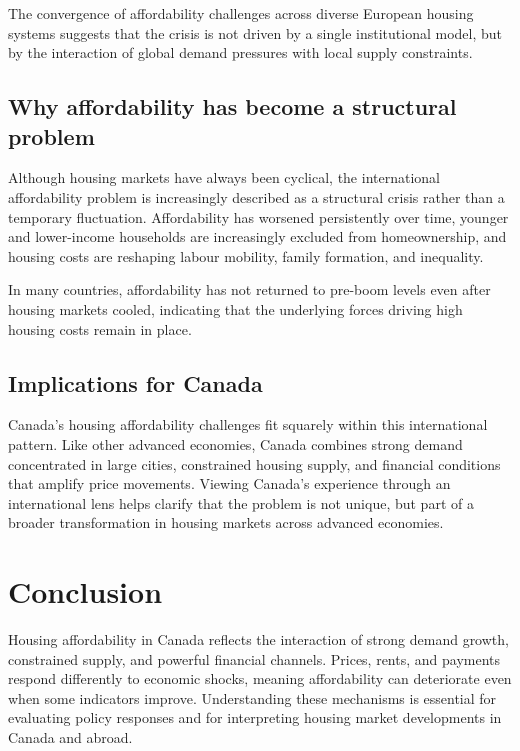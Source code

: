 \documentclass[11pt]{article}
\begin{document}
The convergence of affordability challenges across diverse European housing systems suggests that the crisis is not driven by a single institutional model, but by the interaction of global demand pressures with local supply constraints.

\subsection*{Why affordability has become a structural problem}

Although housing markets have always been cyclical, the international affordability problem is increasingly described as a structural crisis rather than a temporary fluctuation. Affordability has worsened persistently over time, younger and lower-income households are increasingly excluded from homeownership, and housing costs are reshaping labour mobility, family formation, and inequality.

In many countries, affordability has not returned to pre-boom levels even after housing markets cooled, indicating that the underlying forces driving high housing costs remain in place.

\subsection*{Implications for Canada}

Canada’s housing affordability challenges fit squarely within this international pattern. Like other advanced economies, Canada combines strong demand concentrated in large cities, constrained housing supply, and financial conditions that amplify price movements. Viewing Canada’s experience through an international lens helps clarify that the problem is not unique, but part of a broader transformation in housing markets across advanced economies.




\section{Conclusion}

Housing affordability in Canada reflects the interaction of strong demand growth, constrained supply, and powerful financial channels. Prices, rents, and payments respond differently to economic shocks, meaning affordability can deteriorate even when some indicators improve. Understanding these mechanisms is essential for evaluating policy responses and for interpreting housing market developments in Canada and abroad.
\end{document}
